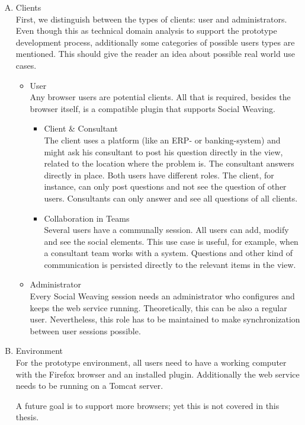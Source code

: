 \begin{enumerate}[A.]
\item Clients\\
First, we distinguish between the types of clients: user and administrators. Even though this as technical domain analysis to support the prototype development process, additionally some categories of possible users types are mentioned. This should give the reader an idea about possible real world use cases. 
\begin{itemize}
	\item User \\ 
		Any browser users are potential clients. All that is required, besides the browser itself, is a compatible plugin that supports Social Weaving. 
		\begin{itemize}
			\item Client \& Consultant \\
			The client uses a platform (like an ERP- or banking-system) and might ask his consultant to post his question directly in the view, related to the location where the problem is. The consultant answers directly in place. Both users have different roles. The client, for instance, can only post questions and not see the question of other users. Consultants can only answer and see all questions of all clients.
			\item Collaboration in Teams\\
			Several users have a communally session. All users can add, modify and see the social elements. This use case is useful, for example, when a consultant team works with a system. Questions and other kind of communication is persisted directly to the relevant items in the view.
		\end{itemize}
	\item Administrator\\
	Every Social Weaving session needs an administrator who configures and keeps the web service running. Theoretically, this can be also a regular user. Nevertheless, this role has to be maintained to make synchronization between user sessions possible. 
\end{itemize}
	
\item Environment\\
For the prototype environment, all users need to have a working computer with the Firefox browser and an installed plugin.  Additionally the web service needs to be running on a Tomcat server. 

A future goal is to support more browsers; yet this is not covered in this thesis. 


\end{enumerate}
